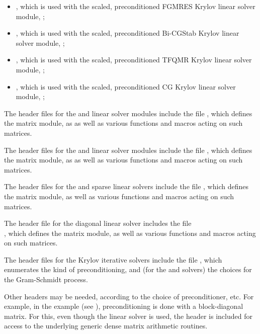 \begin{itemize}
\begin{itemize}
  \item {},
    which is used with the scaled, preconditioned FGMRES Krylov linear
    solver module, {\sunlinsolspfgmr};
    
  \item {},
    which is used with the scaled, preconditioned Bi-CGStab Krylov
    linear solver module, {\sunlinsolspbcgs};
    
  \item {},
    which is used with the scaled, preconditioned TFQMR Krylov linear
    solver module, {\sunlinsolsptfqmr};
    
  \item {},
    which is used with the scaled, preconditioned CG Krylov linear
    solver module, {\sunlinsolpcg};
  \end{itemize}
\end{itemize}

The header files for the {\sunlinsoldense} and {\sunlinsollapdense}
linear solver modules include the file
, which defines the {\sunmatdense}
matrix module, as as well as various functions and macros acting on
such matrices. 

The header files for the {\sunlinsolband} and {\sunlinsollapband}
linear solver modules include the file
, which defines the {\sunmatband}
matrix module, as as well as various functions and macros acting on
such matrices. 

The header files for the {\sunlinsolklu} and {\sunlinsolslumt}
sparse linear solvers include the file
, which defines the {\sunmatsparse}
matrix module, as well as various functions and macros acting on such
matrices.

The header file for the {\sunlinsoldiag} diagonal linear solver
includes the file \\
\noindent{}, which defines
the {\sunmatdiag} matrix module, as well as various functions and
macros acting on such matrices.

The header files for the Krylov iterative solvers include the file
, which enumerates the kind of
preconditioning, and (for the {\spgmr} and {\spfgmr} solvers) the
choices for the Gram-Schmidt process. 

Other headers may be needed, according to the choice of
preconditioner, etc.  For example, in the 
example (see \cite{cvode_ex}), preconditioning is done with a
block-diagonal matrix. For this, even though the {\sunlinsolspgmr}
linear solver is used, the header  is
included for access to the underlying generic dense matrix arithmetic
routines.

